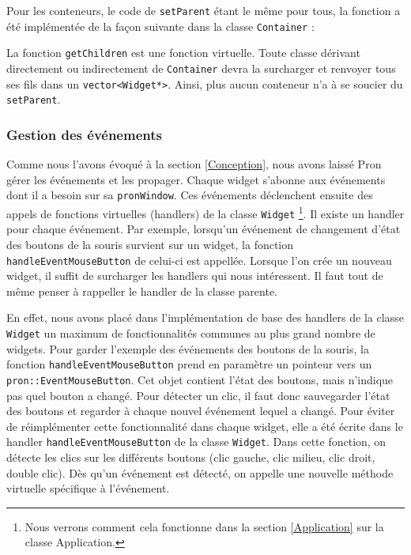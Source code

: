 Pour les conteneurs, le code de \verb|setParent| étant le même pour tous, la fonction a été implémentée de la façon suivante dans la classe \verb|Container| :



La fonction \verb|getChildren| est une fonction virtuelle. Toute classe dérivant directement ou indirectement de \verb|Container| devra la surcharger et renvoyer tous ses fils dans un \verb|vector<Widget*>|. Ainsi, plus aucun conteneur n'a à se soucier du \verb|setParent|.

\subsubsection{Gestion des événements}
\label{Evenements}

Comme nous l'avons évoqué à la section \ref{Conception}, nous avons laissé Pron gérer les événements et les propager.
Chaque widget s'abonne aux événements dont il a besoin sur sa \verb|pronWindow|.
Ces événements déclenchent ensuite des appels de fonctions virtuelles (handlers) de la classe \verb|Widget|
\footnote{Nous verrons comment cela fonctionne dans la section \ref{Application} sur la classe Application.}.
Il existe un handler pour chaque événement.
Par exemple, lorsqu'un événement de changement d'état des boutons de la souris survient sur un widget, la fonction \verb|handleEventMouseButton| de celui-ci est appellée.
Lorsque l'on crée un nouveau widget, il suffit de surcharger les handlers qui nous intéressent. Il faut tout de même penser à rappeller le handler de la classe parente.

En effet, nous avons placé dans l'implémentation de base des handlers de la classe \verb|Widget| un maximum de fonctionnalités communes au plus grand nombre de widgets.
Pour garder l'exemple des événements des boutons de la souris, la fonction \verb|handleEventMouseButton| prend en paramètre un pointeur vers un \verb|pron::EventMouseButton|.
Cet objet contient l'état des boutons, mais n'indique pas quel bouton a changé.
Pour détecter un clic, il faut donc sauvegarder l'état des boutons et regarder à chaque nouvel événement lequel a changé.
Pour éviter de réimplémenter cette fonctionnalité dans chaque widget, elle a été écrite dans le handler \verb|handleEventMouseButton| de la classe \verb|Widget|.
Dans cette fonction, on détecte les clics sur les différents boutons (clic gauche, clic milieu, clic droit, double clic).
Dès qu'un événement est détecté, on appelle une nouvelle méthode virtuelle spécifique à l'événement.

